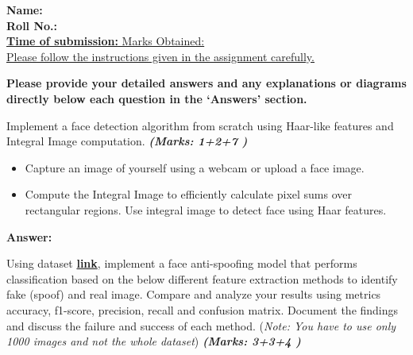 \documentclass[12pt, a4paper]{exam}
\begin{document}
\par
\vspace{0.2in}
\noindent
\textbf{Name: }\\
\noindent
\textbf{Roll No.:  }\\
\noindent
\uline{\textbf{Time of submission: } \hfill 		\hfill Marks Obtained: } \\
\uline{Please follow the instructions given in the assignment carefully.}
\par 
\vspace{0.15in}
\noindent
\centering
{\small \bfseries  Please provide your detailed answers and any explanations or diagrams directly below each question in the `Answers' section. }
\vspace{0.2in}
\begin{questions}
	\pointsdroppedatright
	\question
Implement a face detection algorithm from scratch using Haar-like features and Integral Image computation. \textbf{\textit{(Marks: 1+2+7 )}}
\begin{itemize}
    \item Capture an image of yourself using a webcam or upload a face image.
    \item Compute the Integral Image to efficiently calculate pixel sums over rectangular regions. Use integral image to detect face using Haar features.
\end{itemize}

\vspace{0.2in}
	\pointsdroppedatright 
\textbf{Answer:}


	
\question Using dataset \href{https://drive.google.com/drive/folders/1OW_1bawO79pRqdVEVmBzp8HSxdSwln_Z?usp=sharing}{\textbf{link}}, implement a face anti-spoofing model that performs classification based on the below different feature extraction methods to identify fake (spoof) and real image. Compare and analyze your results using metrics accuracy, f1-score, precision, recall and confusion matrix. Document the findings and discuss the failure and success of each method. (\textit{Note: You have to use only 1000 images and not the whole dataset})  \textbf{\textit{(Marks: 3+3+4 )}}
\end{questions}
\end{document}
